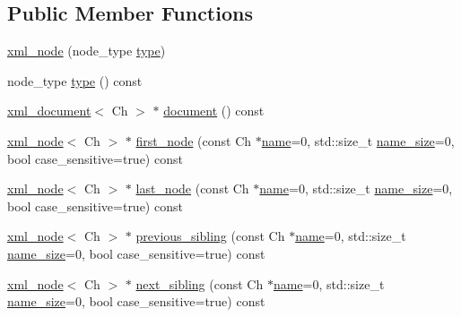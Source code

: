 \subsection*{Public Member Functions}
\begin{DoxyCompactItemize}
\item 
\hyperlink{singletonrapidxml_1_1xml__node_a8bd9019960b90605a45998b661fb1b0e}{xml\+\_\+node} (node\+\_\+type \hyperlink{singletonrapidxml_1_1xml__node_a2c6a4315b98bcfa2e04fed3fa1b22c36}{type})
\item 
node\+\_\+type \hyperlink{singletonrapidxml_1_1xml__node_a2c6a4315b98bcfa2e04fed3fa1b22c36}{type} () const 
\item 
\hyperlink{singletonrapidxml_1_1xml__document}{xml\+\_\+document}$<$ Ch $>$ $\ast$ \hyperlink{singletonrapidxml_1_1xml__node_adb6ad21a4590cf13d4a6a5036e3cdbbc}{document} () const 
\item 
\hyperlink{singletonrapidxml_1_1xml__node}{xml\+\_\+node}$<$ Ch $>$ $\ast$ \hyperlink{singletonrapidxml_1_1xml__node_a2dedeb4e04bb35e06a9a7bddf6ba652d}{first\+\_\+node} (const Ch $\ast$\hyperlink{classrapidxml_1_1xml__base_a9a09739310469995db078ebd0da3ed45}{name}=0, std\+::size\+\_\+t \hyperlink{classrapidxml_1_1xml__base_a7e7f98b3d01e1eab8dc1ca69aad9af84}{name\+\_\+size}=0, bool case\+\_\+sensitive=true) const 
\item 
\hyperlink{singletonrapidxml_1_1xml__node}{xml\+\_\+node}$<$ Ch $>$ $\ast$ \hyperlink{singletonrapidxml_1_1xml__node_a2ace550c18cf10da6303773972d7157f}{last\+\_\+node} (const Ch $\ast$\hyperlink{classrapidxml_1_1xml__base_a9a09739310469995db078ebd0da3ed45}{name}=0, std\+::size\+\_\+t \hyperlink{classrapidxml_1_1xml__base_a7e7f98b3d01e1eab8dc1ca69aad9af84}{name\+\_\+size}=0, bool case\+\_\+sensitive=true) const 
\item 
\hyperlink{singletonrapidxml_1_1xml__node}{xml\+\_\+node}$<$ Ch $>$ $\ast$ \hyperlink{singletonrapidxml_1_1xml__node_a001ece4e227eebbd6ad0ec7dacf1c00b}{previous\+\_\+sibling} (const Ch $\ast$\hyperlink{classrapidxml_1_1xml__base_a9a09739310469995db078ebd0da3ed45}{name}=0, std\+::size\+\_\+t \hyperlink{classrapidxml_1_1xml__base_a7e7f98b3d01e1eab8dc1ca69aad9af84}{name\+\_\+size}=0, bool case\+\_\+sensitive=true) const 
\item 
\hyperlink{singletonrapidxml_1_1xml__node}{xml\+\_\+node}$<$ Ch $>$ $\ast$ \hyperlink{singletonrapidxml_1_1xml__node_ac59af4dd5f0ec715753e42467dff6aed}{next\+\_\+sibling} (const Ch $\ast$\hyperlink{classrapidxml_1_1xml__base_a9a09739310469995db078ebd0da3ed45}{name}=0, std\+::size\+\_\+t \hyperlink{classrapidxml_1_1xml__base_a7e7f98b3d01e1eab8dc1ca69aad9af84}{name\+\_\+size}=0, bool case\+\_\+sensitive=true) const 

\end{DoxyCompactItemize}
